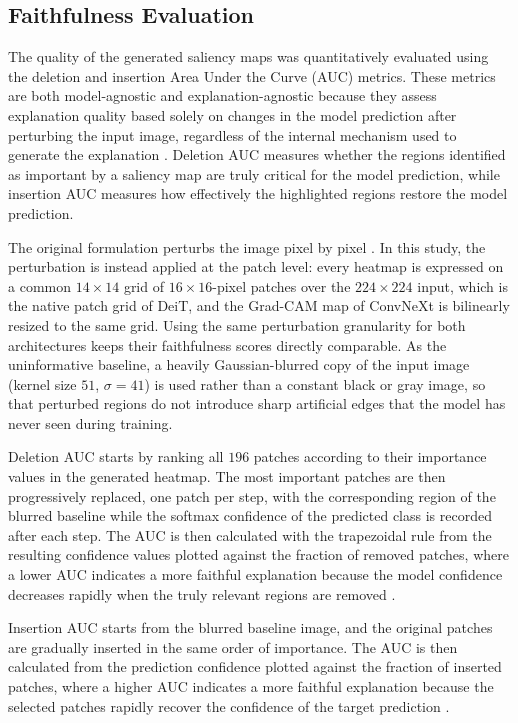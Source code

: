 \subsection{Faithfulness Evaluation}

The quality of the generated saliency maps was quantitatively evaluated using the deletion and insertion Area Under the Curve (AUC) metrics.
These metrics are both model-agnostic and explanation-agnostic because they assess explanation quality based solely on changes in the model prediction after perturbing the input image, regardless of the internal mechanism used to generate the explanation \cite{petsiuk2018riserandomizedinputsampling, Skliarov2025}.
Deletion AUC measures whether the regions identified as important by a saliency map are truly critical for the model prediction, while insertion AUC measures how effectively the highlighted regions restore the model prediction.

The original formulation perturbs the image pixel by pixel \cite{petsiuk2018riserandomizedinputsampling}.
In this study, the perturbation is instead applied at the patch level: every heatmap is expressed on a common $14 \times 14$ grid of $16 \times 16$-pixel patches over the $224 \times 224$ input, which is the native patch grid of DeiT, and the Grad-CAM map of ConvNeXt is bilinearly resized to the same grid.
Using the same perturbation granularity for both architectures keeps their faithfulness scores directly comparable.
As the uninformative baseline, a heavily Gaussian-blurred copy of the input image (kernel size $51$, $\sigma = 41$) is used rather than a constant black or gray image, so that perturbed regions do not introduce sharp artificial edges that the model has never seen during training.

Deletion AUC starts by ranking all $196$ patches according to their importance values in the generated heatmap.
The most important patches are then progressively replaced, one patch per step, with the corresponding region of the blurred baseline while the softmax confidence of the predicted class is recorded after each step.
The AUC is then calculated with the trapezoidal rule from the resulting confidence values plotted against the fraction of removed patches, where a lower AUC indicates a more faithful explanation because the model confidence decreases rapidly when the truly relevant regions are removed \cite{Cheng2025}.

Insertion AUC starts from the blurred baseline image, and the original patches are gradually inserted in the same order of importance.
The AUC is then calculated from the prediction confidence plotted against the fraction of inserted patches, where a higher AUC indicates a more faithful explanation because the selected patches rapidly recover the confidence of the target prediction \cite{Cheng2025}.